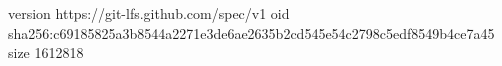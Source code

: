 version https://git-lfs.github.com/spec/v1
oid sha256:c69185825a3b8544a2271e3de6ae2635b2cd545e54c2798c5edf8549b4ce7a45
size 1612818
